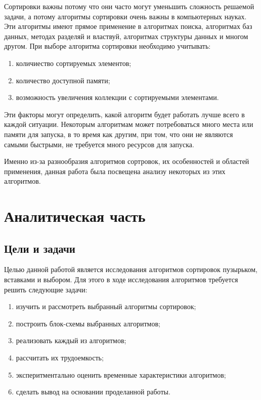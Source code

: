 \documentclass[12pt]{report}
\begin{document}
Сортировки важны потому что они часто могут уменьшить сложность решаемой задачи, а потому алгоритмы сортировки очень важны в компьютерных науках. Эти алгоритмы имеют прямое применение в алгоритмах поиска, алгоритмах баз данных, методах разделяй и властвуй, алгоритмах структуры данных и многом другом.\newline\newline
При выборе алгоритма сортировки необходимо учитывать: 
\begin{enumerate}
	\item количиество сортируемых элементов;
	\item количество доступной памяти;
	\item возможность увеличения коллекции с сортируемыми элементами.
\end{enumerate}
  

Эти факторы могут определить, какой алгоритм будет работать лучше всего в каждой ситуации. Некоторым алгоритмам может потребоваться много места или памяти для запуска, в то время как другим, при том, что они не являются самыми быстрыми, не требуется много ресурсов для запуска.

Именно из-за разнообразия алгоритмов сортровок, их особенностей и областей применения, данная работа была посвещена анализу некоторых из этих алгоритмов.
	
	
	

	
	\chapter{Аналитическая часть}
	
	\section{Цели и задачи}
	
	Целью данной работой является исследования алгоритмов сортировок пузырьком, вставками и выбором. Для этого в ходе исследования алгоритмов требуется решить следующие задачи:
	\begin{enumerate}
		\item изучить и рассмотреть выбранный алгоритмы сортировок;
		\item построить блок-схемы выбранных алгоритмов;
		\item реализовать каждый из алгоритмов;
		\item рассчитать их трудоемкость;
		\item эксперитментально оценить временные характеристики алгоритмов;
		\item сделать вывод на основании проделанной работы.
	\end{enumerate}
	
\end{document}
